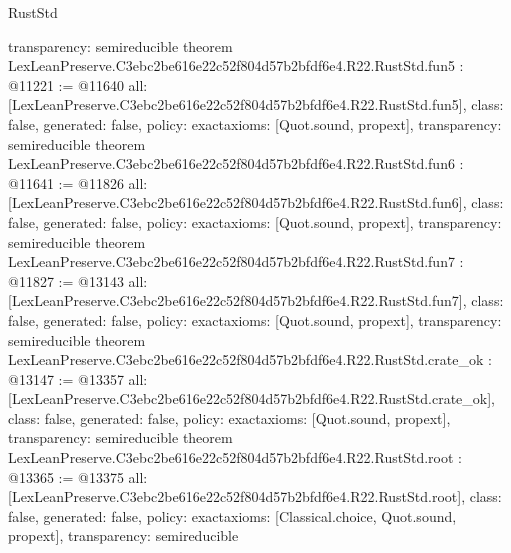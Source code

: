 \begin{lexlean}{RustStd}
\begin{coremodule}
{  transparency: semireducible
}
theorem LexLeanPreserve.C3ebc2be616e22c52f804d57b2bfdf6e4.R22.RustStd.fun5 : @11221 := @11640 {
  all: [LexLeanPreserve.C3ebc2be616e22c52f804d57b2bfdf6e4.R22.RustStd.fun5],
  class: false,
  generated: false,
  policy: exact{axioms: [Quot.sound, propext]},
  transparency: semireducible
}
theorem LexLeanPreserve.C3ebc2be616e22c52f804d57b2bfdf6e4.R22.RustStd.fun6 : @11641 := @11826 {
  all: [LexLeanPreserve.C3ebc2be616e22c52f804d57b2bfdf6e4.R22.RustStd.fun6],
  class: false,
  generated: false,
  policy: exact{axioms: [Quot.sound, propext]},
  transparency: semireducible
}
theorem LexLeanPreserve.C3ebc2be616e22c52f804d57b2bfdf6e4.R22.RustStd.fun7 : @11827 := @13143 {
  all: [LexLeanPreserve.C3ebc2be616e22c52f804d57b2bfdf6e4.R22.RustStd.fun7],
  class: false,
  generated: false,
  policy: exact{axioms: [Quot.sound, propext]},
  transparency: semireducible
}
theorem LexLeanPreserve.C3ebc2be616e22c52f804d57b2bfdf6e4.R22.RustStd.crate_ok : @13147 := @13357 {
  all: [LexLeanPreserve.C3ebc2be616e22c52f804d57b2bfdf6e4.R22.RustStd.crate_ok],
  class: false,
  generated: false,
  policy: exact{axioms: [Quot.sound, propext]},
  transparency: semireducible
}
theorem LexLeanPreserve.C3ebc2be616e22c52f804d57b2bfdf6e4.R22.RustStd.root : @13365 := @13375 {
  all: [LexLeanPreserve.C3ebc2be616e22c52f804d57b2bfdf6e4.R22.RustStd.root],
  class: false,
  generated: false,
  policy: exact{axioms: [Classical.choice, Quot.sound, propext]},
  transparency: semireducible
}


\end{coremodule}
\end{lexlean}
